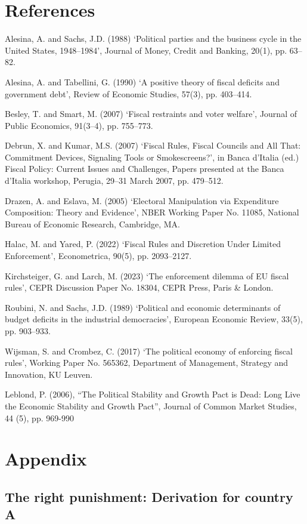 \documentclass{article}
\begin{document}
\section{References}

Alesina, A. and Sachs, J.D. (1988) ‘Political parties and the business cycle in the United States, 1948–1984’, Journal of Money, Credit and Banking, 20(1), pp. 63–82. 


Alesina, A. and Tabellini, G. (1990) ‘A positive theory of fiscal deficits and government debt’, Review of Economic Studies, 57(3), pp. 403–414. 


Besley, T. and Smart, M. (2007) ‘Fiscal restraints and voter welfare’, Journal of Public Economics, 91(3–4), pp. 755–773. 


Debrun, X. and Kumar, M.S. (2007) ‘Fiscal Rules, Fiscal Councils and All That: Commitment Devices, Signaling Tools or Smokescreens?’, in Banca d’Italia (ed.) Fiscal Policy: Current Issues and Challenges, Papers presented at the Banca d’Italia workshop, Perugia, 29–31 March 2007, pp. 479–512. 


Drazen, A. and Eslava, M. (2005) ‘Electoral Manipulation via Expenditure Composition: Theory and Evidence’, NBER Working Paper No. 11085, National Bureau of Economic Research, Cambridge, MA. 


Halac, M. and Yared, P. (2022) ‘Fiscal Rules and Discretion Under Limited Enforcement’, Econometrica, 90(5), pp. 2093–2127. 


Kirchsteiger, G. and Larch, M. (2023) ‘The enforcement dilemma of EU fiscal rules’, CEPR Discussion Paper No. 18304, CEPR Press, Paris \& London. 


Roubini, N. and Sachs, J.D. (1989) ‘Political and economic determinants of budget deficits in the industrial democracies’, European Economic Review, 33(5), pp. 903–933. 


Wijsman, S. and Crombez, C. (2017) ‘The political economy of enforcing fiscal rules’, Working Paper No. 565362, Department of Management, Strategy and Innovation, KU Leuven. 

Leblond, P. (2006), “The Political Stability and Growth Pact is Dead: Long Live the Economic Stability and Growth Pact”, Journal of Common Market Studies, 44 (5), pp. 969-990


\section{Appendix}

\subsection {The right punishment: Derivation for country A}
\end{document}
